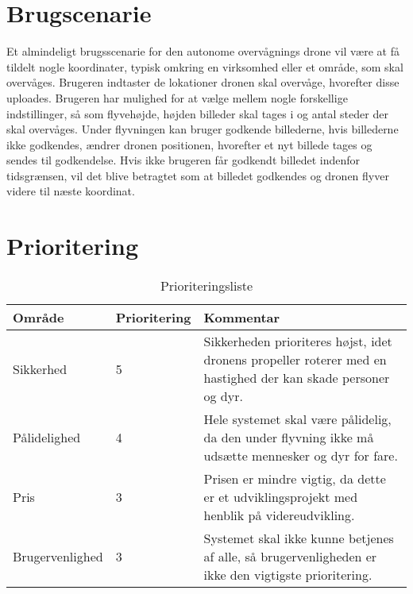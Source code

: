 \section{Brugscenarie}

Et almindeligt brugsscenarie for den autonome overvågnings drone vil være at få tildelt nogle koordinater, typisk omkring en virksomhed eller et område, som skal overvåges.
Brugeren indtaster de lokationer dronen skal overvåge, hvorefter disse uploades. 
Brugeren har mulighed for at vælge mellem nogle forskellige indstillinger, så som flyvehøjde, højden billeder skal tages i og antal steder der skal overvåges.
Under flyvningen kan bruger godkende billederne, hvis billederne ikke godkendes, ændrer dronen positionen, hvorefter et nyt billede tages og sendes til godkendelse. Hvis ikke brugeren får godkendt billedet indenfor tidsgrænsen, vil det blive betragtet som at billedet godkendes og dronen flyver videre til næste koordinat.

\section{Prioritering}

\begin{table}[H]
	\centering
		\begin{tabular}{|l|l|p{7 cm}|} 
		\hline
			Område & Prioritering & Kommentar \\ \hline
			Sikkerhed 		& 5 	& Sikkerheden prioriteres højst, idet dronens propeller roterer med en hastighed der kan skade personer og dyr.   \\ \hline
			
			Pålidelighed 	& 4 	& Hele systemet skal være pålidelig, da den under flyvning ikke må udsætte mennesker og dyr for fare.  \\ \hline
			
			Pris 			& 3 	& Prisen er mindre vigtig, da dette er et udviklingsprojekt med henblik på videreudvikling.   \\ \hline
			
			Brugervenlighed & 3 	& Systemet skal ikke kunne betjenes af alle, så brugervenligheden er ikke den vigtigste prioritering. \\ \hline
		\end{tabular}
	\caption{Prioriteringsliste}
\end{table}
